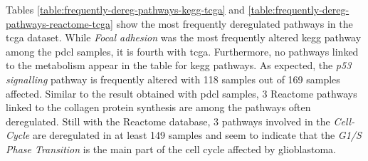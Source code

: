 Tables \ref*{table:frequently-dereg-pathways-kegg-tcga} and \ref*{table:frequently-dereg-pathways-reactome-tcga} show the most frequently deregulated pathways in the \acrshort{tcga} dataset.
While \textit{Focal adhesion} was the most frequently altered \acrshort{kegg} pathway among the \acrshort{pdcl} samples, it is fourth with \acrshort{tcga}.
Furthermore, no pathways linked to the metabolism appear in the table for \acrshort{kegg} pathways.
As expected, the \textit{p53 signalling} pathway is frequently altered with 118 samples out of 169 samples affected.
Similar to the result obtained with \acrshort{pdcl} samples, 3 Reactome pathways linked to the collagen protein synthesis are among the pathways often deregulated.
Still with the Reactome database, 3 pathways involved in the \textit{Cell-Cycle} are deregulated in at least 149 samples and seem to indicate that the \textit{G1/S Phase Transition} is the main part of the cell cycle affected by glioblastoma.

